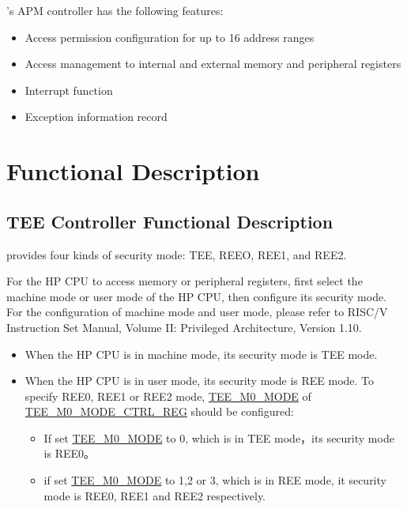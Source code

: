 \documentclass[main\_\_EN.tex]{subfiles}
\begin{document}
\chipname{}'s APM controller has the following features:

\begin{itemize}
    \item Access permission configuration for up to 16 address ranges
    \item Access management to internal and external memory and peripheral registers
    \item Interrupt function
    \item Exception information record
\end{itemize}

\section{Functional Description}

\subsection{TEE Controller Functional Description}

\chipname{} provides four kinds of security mode: TEE, REEO, REE1, and REE2. 

For the HP CPU to access memory or peripheral registers, first select the machine mode or user mode of the HP CPU, then configure its security mode. For the configuration of machine mode and user mode, please refer to RISC\-/V Instruction Set Manual, Volume II: Privileged Architecture, Version 1.10.

\begin{itemize}
    \item When the HP CPU is in machine mode, its security mode is TEE mode.
    \item When the HP CPU is in user mode, its security mode is REE mode. To specify REE0, REE1 or REE2 mode, \hyperref[fielddesc:TEEM0MODE]{TEE\_M0\_MODE} of \hyperref[regdesc:TEEM0MODECTRLREG]{TEE\_M0\_MODE\_CTRL\_REG} should be configured: 
    \begin{itemize}
        \item If set \hyperref[fielddesc:TEEM0MODE]{TEE\_M0\_MODE} to 0, which is in TEE mode，its security mode is REE0。
        \item if set \hyperref[fielddesc:TEEM0MODE]{TEE\_M0\_MODE} to 1,2 or 3, which is in REE mode, it security mode is REE0, REE1 and REE2 respectively.
    \end{itemize}
\end{itemize}
\end{document}
